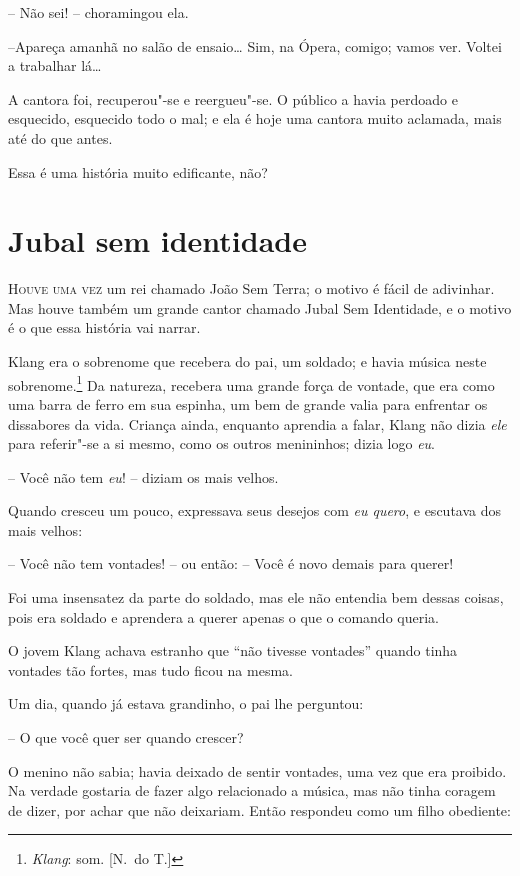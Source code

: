 -- Não sei! -- choramingou ela.

--Apareça amanhã no salão de ensaio\ldots{} Sim, na Ópera, comigo; vamos ver.
Voltei a trabalhar lá\ldots{}

A cantora foi, recuperou"-se e reergueu"-se. O público a havia
perdoado e esquecido, esquecido todo o mal; e ela é hoje uma cantora
muito aclamada, mais até do que antes.

Essa é uma história muito edificante, não?

\chapter{Jubal sem identidade}


\textsc{Houve uma vez} um rei chamado João Sem Terra; o motivo é fácil de
adivinhar. Mas houve também um grande cantor chamado Jubal Sem
Identidade, e o motivo é o que essa história vai narrar.

Klang era o sobrenome que recebera do pai, um soldado; e havia música
neste sobrenome.\footnote{ \textit{Klang}: som. [N.~do T.]} Da natureza, recebera uma grande força de vontade, que
era como uma barra de ferro em sua espinha, um bem de grande valia para
enfrentar os dissabores da vida. Criança ainda, enquanto aprendia a
falar, Klang não dizia \textit{ele} para referir"-se a si mesmo, como os
outros menininhos; dizia logo \textit{eu}.

-- Você não tem \textit{eu}! -- diziam os mais velhos.

Quando cresceu um pouco, expressava seus desejos com \textit{eu quero},
e escutava dos mais velhos: 

-- Você não tem vontades! -- ou então: -- Você é novo demais para querer!

Foi uma insensatez da parte do soldado, mas ele não entendia bem dessas
coisas, pois era soldado e aprendera a querer apenas o que o comando
queria.

O jovem Klang achava estranho que ``não tivesse vontades'' quando tinha
vontades tão fortes, mas tudo ficou na mesma.

 Um dia, quando já estava grandinho, o pai lhe perguntou:

-- O que você quer ser quando crescer?

O menino não sabia; havia deixado de sentir vontades, uma vez que era
proibido. Na verdade gostaria de fazer algo relacionado a música, mas
não tinha coragem de dizer, por achar que não deixariam. Então
respondeu como um filho obediente: 

